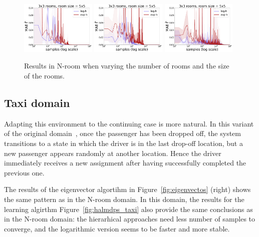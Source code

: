 \begin{figure}
  \includegraphics*[width=0.32\textwidth]{figures/chapter2/online/nrooms_3_3_gammas_1.png}
  \includegraphics*[width=0.32\textwidth]{figures/chapter2/online/nrooms_5_5_gammas_1.png}
  \includegraphics*[width=0.32\textwidth]{figures/chapter2/online/nrooms_8_8_gammas_1.png}


  \caption{Results in N-room when varying the number of rooms and the size of the rooms.}
  \label{fig:halmdps_nrooms}
  \end{figure}
  


  \subsection{Taxi domain}
  Adapting this environment to the continuing case is more natural. In this variant of the original domain~\citep{Dietterich2000}, once the passenger has been dropped off, the system transitions to a state in which the driver is in the last drop-off location, but a new passenger appears randomly at another location. Hence the driver immediately receives a new assignment after having successfully completed the previous one. 

  The results of the eigenvector algortihm in Figure~\ref{fig:eigenvectos} (right) shows the same pattern as in the N-room domain. In this domain, the results for the learning algirthm Figure~\ref{fig:halmdps_taxi} also provide the same conclusions as in the N-room domain: the hierarhical approaches need less number of samples to converge, and the logarithmic version seems to be faster and more stable.



